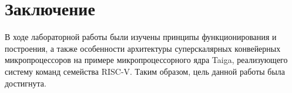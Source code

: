 \chapter*{Заключение}

В ходе лабораторной работы были изучены принципы функционирования и построения, а также особенности архитектуры суперскалярных конвейерных микропроцессоров на примере микропроцессорного ядра Taiga, реализующего систему команд семейства RISC-V. Таким образом, цель данной
работы была достигнута.
